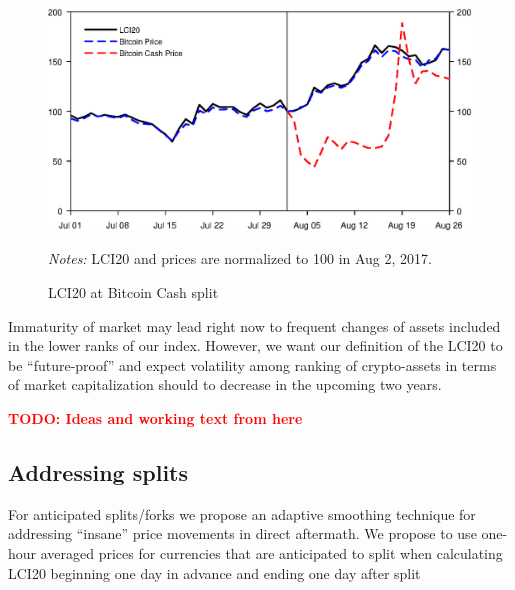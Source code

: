 \documentclass[11pt]{article}
\newcommand\fnotes[1]{\captionsetup{font=scriptsize}\caption*{\textsl{Notes:} #1}}
\newcommand{\todo}[1]{\textbf{\textcolor{red}{TODO: #1}}}
\begin{document}
\begin{figure}[p]%
    \centering%
    \caption{LCI20 at Bitcoin Cash split}\label{f:split}%
    \includegraphics[width=\textwidth]{figs/lci20_bch_split.eps}%
    \medskip\newline%
    \fnotes{LCI20 and prices are normalized to 100 in Aug 2, 2017.}
\end{figure}

Immaturity of market may lead right now to frequent changes of assets included in the lower ranks of our index.
However, we want our definition of the LCI20 to be ``future-proof'' and expect volatility among ranking of crypto-assets in terms of market capitalization should to decrease in the upcoming two years.





\pagebreak

\todo{Ideas and working text from here}


\subsection{Addressing splits}\label{subseq:split_smoothing}
For anticipated splits/forks we propose an adaptive smoothing technique for addressing ``insane'' price movements in direct aftermath.
We propose to use one-hour averaged prices for currencies that are anticipated to split when calculating LCI20 beginning one day in advance and ending one day after split
\end{document}
